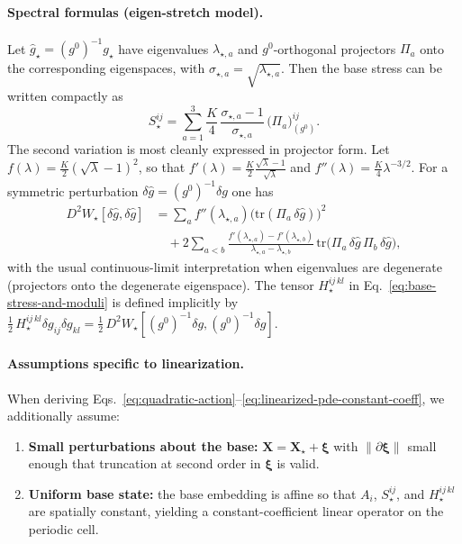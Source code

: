 \paragraph{Spectral formulas (eigen-stretch model).}
Let $\widehat g_\star=(g^0)^{-1}g_\star$ have eigenvalues $\lambda_{\star,a}$ and
$g^0$-orthogonal projectors $\Pi_a$ onto the corresponding eigenspaces, with $\sigma_{\star,a}=\sqrt{\lambda_{\star,a}}$.
Then the base stress can be written compactly as
\begin{equation}
  S_\star^{ij}
  =
  \sum_{a=1}^3
  \frac{K}{4}\,\frac{\sigma_{\star,a}-1}{\sigma_{\star,a}}\,
  \big(\Pi_a\big)^{ij}_{(g^0)}.
  \label{eq:base-stress-spectral}
\end{equation}
The second variation is most cleanly expressed in projector form. Let
$f(\lambda)=\frac{K}{2}(\sqrt{\lambda}-1)^2$, so that
$f'(\lambda)=\frac{K}{2}\frac{\sqrt{\lambda}-1}{\sqrt{\lambda}}$ and
$f''(\lambda)=\frac{K}{4}\lambda^{-3/2}$.
For a symmetric perturbation $\delta\widehat g=(g^0)^{-1}\delta g$ one has
\begin{align}
  D^2W_\star[\delta\widehat g,\delta\widehat g]
  &=
  \sum_a f''(\lambda_{\star,a})\big(\mathrm{tr}(\Pi_a\,\delta \widehat g)\big)^2
  \nonumber\\
  &\quad+
  2\sum_{a<b}
  \frac{f'(\lambda_{\star,a})-f'(\lambda_{\star,b})}{\lambda_{\star,a}-\lambda_{\star,b}}\,
  \mathrm{tr}\big(\Pi_a\,\delta \widehat g\,\Pi_b\,\delta \widehat g\big),
  \label{eq:second-variation-spectral}
\end{align}
with the usual continuous-limit interpretation when eigenvalues are degenerate (projectors onto the degenerate eigenspace).
The tensor $H_\star^{ij\,kl}$ in Eq.~\eqref{eq:base-stress-and-moduli} is defined implicitly by
$\tfrac12\,H_\star^{ij\,kl}\delta g_{ij}\delta g_{kl}=\tfrac12\,D^2W_\star[(g^0)^{-1}\delta g,(g^0)^{-1}\delta g]$.

\paragraph{Assumptions specific to linearization.}
When deriving Eqs.~\eqref{eq:quadratic-action}--\eqref{eq:linearized-pde-constant-coeff},
we additionally assume:

\begin{enumerate}
  \item \textbf{Small perturbations about the base:}
  $\mathbf X=\mathbf X_\star+\boldsymbol\xi$ with $\|\partial\boldsymbol\xi\|$ small enough that
  truncation at second order in $\boldsymbol\xi$ is valid.

  \item \textbf{Uniform base state:}
  the base embedding is affine so that $A_i$, $S_\star^{ij}$, and $H_\star^{ij\,kl}$ are spatially constant,
  yielding a constant-coefficient linear operator on the periodic cell.
\end{enumerate}


